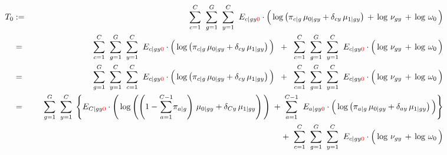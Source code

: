 \begin{eqnarray*}
T_{0}
&:=&
	\overset{C}{\underset{c=1}{\sum}}\;\;
	\overset{G}{\underset{g=1}{\sum}}\;\;
	\overset{C}{\underset{y=1}{\sum}}\;\;
	E_{c \vert gy{\color{red}0}}
	\cdot
	\left(\,
		\log\left(\pi_{c \vert g}\,\mu_{0 \vert gy} + \delta_{cy}\,\mu_{1\vert gy}\right)
		\,\overset{{\color{white}.}}{+}\,
		\log\,\nu_{gy}
		\,\overset{{\color{white}.}}{+}\,
		\log\,\omega_{0}
	\,\right)
\\
&=&
	\overset{C}{\underset{c=1}{\sum}}\;\;
	\overset{G}{\underset{g=1}{\sum}}\;\;
	\overset{C}{\underset{y=1}{\sum}}\;\;
	E_{c \vert gy{\color{red}0}}
	\cdot
	\left(\,
		\overset{{\color{white}.}}{\log}\left(\pi_{c \vert g}\,\mu_{0 \vert gy} + \delta_{cy}\,\mu_{1\vert gy}\right)
	\,\right)
	\;\; + \;\;
	\overset{C}{\underset{c=1}{\sum}}\;\;
	\overset{G}{\underset{g=1}{\sum}}\;\;
	\overset{C}{\underset{y=1}{\sum}}\;\;
	E_{c \vert gy{\color{red}0}}
	\cdot
	\left(\,
		\log\,\nu_{gy}
		\,\overset{{\color{white}.}}{+}\,
		\log\,\omega_{0}
	\,\right)	
\\
&=&
	\overset{G}{\underset{g=1}{\sum}}\;\;
	\overset{C}{\underset{y=1}{\sum}}\;\;
	\overset{C}{\underset{c=1}{\sum}}\;\;
	E_{c \vert gy{\color{red}0}}
	\cdot
	\left(\,
		\overset{{\color{white}.}}{\log}\left(\pi_{c \vert g}\,\mu_{0 \vert gy} + \delta_{cy}\,\mu_{1\vert gy}\right)
	\,\right)
	\;\; + \;\;
	\overset{C}{\underset{c=1}{\sum}}\;\;
	\overset{G}{\underset{g=1}{\sum}}\;\;
	\overset{C}{\underset{y=1}{\sum}}\;\;
	E_{c \vert gy{\color{red}0}}
	\cdot
	\left(\,
		\log\,\nu_{gy}
		\,\overset{{\color{white}.}}{+}\,
		\log\,\omega_{0}
	\,\right)	
\\
&=&
	{\color{white}+} \;\;
	\overset{G}{\underset{g=1}{\sum}}\;\;
	\overset{C}{\underset{y=1}{\sum}}\;
	\left\{
	E_{C \vert gy{\color{red}0}}
	\cdot
	\left(\,
		\overset{{\color{white}.}}{\log}\left(
			\left(1-\overset{C-1}{\underset{a=1}{\sum}}\pi_{a \vert g}\right)\,\mu_{0 \vert gy}
			+
			\delta_{Cy}\,\mu_{1\vert gy}
			\right)
	\,\right)
	\;+\;
	\overset{C-1}{\underset{a=1}{\sum}}\;\;
	E_{a \vert gy{\color{red}0}}
	\cdot
	\left(\,
		\overset{{\color{white}.}}{\log}\left(\pi_{a \vert g}\,\mu_{0 \vert gy}
		+
		\delta_{ay}\,\mu_{1\vert gy}\right)
	\,\right)
	\right\}
\\
&&
	+ \;\;
	\overset{C}{\underset{c=1}{\sum}}\;\;
	\overset{G}{\underset{g=1}{\sum}}\;\;
	\overset{C}{\underset{y=1}{\sum}}\;\;
	E_{c \vert gy{\color{red}0}}
	\cdot
	\left(\,
		\log\,\nu_{gy}
		\,\overset{{\color{white}.}}{+}\,
		\log\,\omega_{0}
	\,\right)	
\end{eqnarray*}

